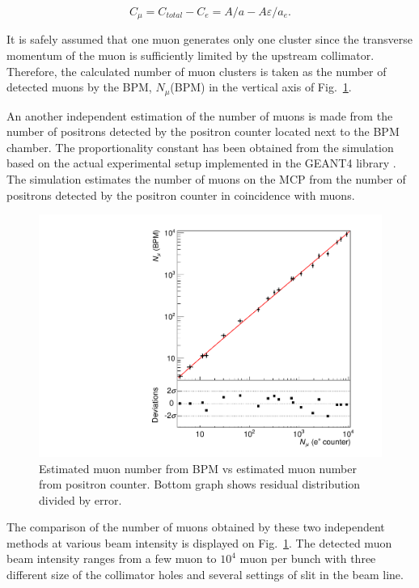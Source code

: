 \documentclass[preprint,3p,twocolumn]{elsarticle}
\begin{document}
\begin{linenomath}
\begin{equation}
C_{\mu} = C_{total} - C_{e}= A/a - A\varepsilon/a_e.
\end{equation}
\end{linenomath}

It is safely assumed that one muon generates only one cluster
since the transverse momentum of the muon is sufficiently limited
by the upstream collimator. Therefore, the calculated number of
muon clusters is taken as the number of detected muons by the
BPM, $N_{\mu}$(BPM) in the vertical axis of
Fig.~\ref{fig:muvsmu}.

An another independent estimation of the number of muons is made
from the number of positrons detected by the positron counter
located next to the BPM chamber. The proportionality constant has
been obtained from the simulation based on the actual
experimental setup implemented in the GEANT4 library
\cite{geant4}.  The simulation estimates the number of muons on
the MCP from the number of positrons detected by the positron
counter in coincidence with muons.

\begin{figure}[tbp]
	\centering
	\includegraphics[width=\columnwidth]{figure/lin.pdf}
        \caption{Estimated muon number from BPM vs estimated muon
          number from positron counter.  Bottom graph shows
          residual distribution divided by error.}
\label{fig:muvsmu}
\end{figure}

The comparison of the number of muons obtained by these two
independent methods at various beam intensity is displayed on
Fig.~\ref{fig:muvsmu}. The detected muon beam intensity ranges
from a few muon to $10^{4}$ muon per bunch with three different
size of the collimator holes and several settings of slit in the
beam line.
\end{document}

